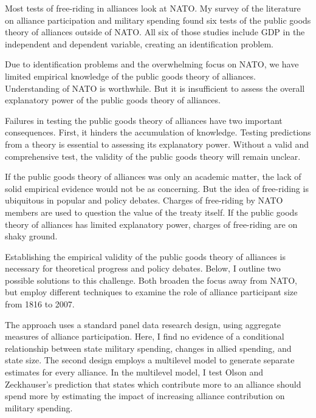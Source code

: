 \documentclass[12pt]{article}
\begin{document}
Most tests of free-riding in alliances look at NATO. 
My survey of the literature on alliance participation and military spending found six tests of the public goods theory of alliances outside of NATO. 
All six of those studies include GDP in the independent and dependent variable, creating an identification problem. 


Due to identification problems and the overwhelming focus on NATO, we have limited empirical knowledge of the public goods theory of alliances. 
Understanding of NATO is worthwhile. 
But it is insufficient to assess the overall explanatory power of the public goods theory of alliances. 




Failures in testing the public goods theory of alliances have two important consequences. 
First, it hinders the accumulation of knowledge. 
Testing predictions from a theory is essential to assessing its explanatory power. 
Without a valid and comprehensive test, the validity of the public goods theory will remain unclear. 


If the public goods theory of alliances was only an academic matter, the lack of solid empirical evidence would not be as concerning. 
But the idea of free-riding is ubiquitous in popular and policy debates. 
Charges of free-riding by NATO members are used to question the value of the treaty itself. 
If the public goods theory of alliances has limited explanatory power, charges of free-riding are on shaky ground. 


Establishing the empirical validity of the public goods theory of alliances is necessary for theoretical progress and policy debates. 
Below, I outline two possible solutions to this challenge. 
Both broaden the focus away from NATO, but employ different techniques to examine the role of alliance participant size from 1816 to 2007. 


The approach uses a standard panel data research design, using aggregate measures of alliance participation.
Here, I find no evidence of a conditional relationship between state military spending, changes in allied spending, and state size. 
The second design employs a multilevel model to generate separate estimates for every alliance. 
In the multilevel model, I test Olson and Zeckhauser's prediction that states which contribute more to an alliance should spend more by estimating the impact of increasing alliance contribution on military spending. 
\end{document}
